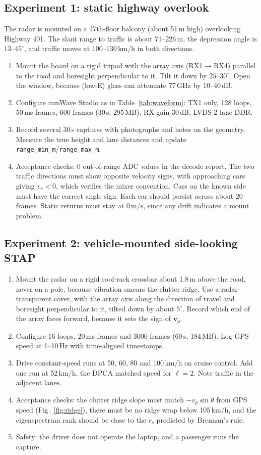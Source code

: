 \documentclass[conference]{IEEEtran}
\newcommand{\vect}[1]{\mathbf{#1}}
\begin{document}
\subsection{Experiment 1: static highway overlook}
The radar is mounted on a 17th-floor balcony (about 51\,m high) overlooking Highway 401. The
slant range to traffic is about 71--226\,m, the depression angle is $13$--$45^\circ$, and
traffic moves at 100--130\,km/h in both directions.
\begin{enumerate}
\item Mount the board on a rigid tripod with the array axis (RX1$\rightarrow$RX4) parallel to the
road and boresight perpendicular to it. Tilt it down by $25$--$30^\circ$. Open the window, because
(low-E) glass can attenuate 77\,GHz by 10--40\,dB.
\item Configure mmWave Studio as in Table~\ref{tab:waveform}: TX1 only, 128 loops, 50\,ms frames,
600 frames (30\,s, 295\,MB), RX gain 30\,dB, LVDS 2-lane DDR.
\item Record several 30\,s captures with photographs and notes on the geometry. Measure the true
height and lane distances and update \texttt{range\_min\_m}/\texttt{range\_max\_m}.
\item Acceptance checks: 0 out-of-range ADC values in the decode report. The two traffic
directions must show opposite velocity signs, with approaching cars giving $v_r<0$, which
verifies the mixer convention. Cars on the known side must have the correct angle sign. Each car
should persist across about 20 frames. Static returns must stay at 0\,m/s, since any drift
indicates a mount problem.
\end{enumerate}

\subsection{Experiment 2: vehicle-mounted side-looking STAP}
\begin{enumerate}
\item Mount the radar on a rigid roof-rack crossbar about 1.8\,m above the road, never on a pole,
because vibration smears the clutter ridge. Use a radar-transparent cover, with the array axis
along the direction of travel and boresight perpendicular to it, tilted down by about $5^\circ$.
Record which end of the array faces forward, because it sets the sign of $\vect v_p$.
\item Configure 16 loops, 20\,ms frames and 3000 frames (60\,s, 184\,MB). Log GPS speed at 1--10\,Hz
with time-aligned timestamps.
\item Drive constant-speed runs at 50, 60, 80 and 100\,km/h on cruise control. Add one run at
52\,km/h, the DPCA matched speed for $\ell=2$. Note traffic in the adjacent lanes.
\item Acceptance checks: the clutter ridge slope must match $-v_p\sin\theta$ from GPS speed
(Fig.~\ref{fig:ridge}), there must be no ridge wrap below 105\,km/h, and the eigenspectrum rank
should be close to the $r_c$ predicted by Brennan's rule.
\item Safety: the driver does not operate the laptop, and a passenger runs the capture.
\end{enumerate}
\end{document}
